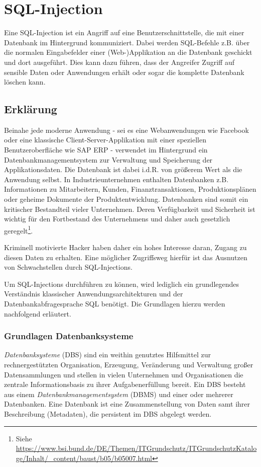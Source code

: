 \chapter{SQL-Injection}
Eine SQL-Injection ist ein Angriff auf eine Benutzerschnittstelle, die mit einer Datenbank im Hintergrund kommuniziert. Dabei werden SQL-Befehle z.B. über die normalen Eingabefelder einer (Web-)Applikation an die Datenbank geschickt und dort ausgeführt. Dies kann dazu führen, dass der Angreifer Zugriff auf sensible Daten oder Anwendungen erhält oder sogar die komplette Datenbank löschen kann. 

\section{Erklärung}
Beinahe jede moderne Anwendung - sei es eine Webanwendungen wie Facebook oder eine klassische Client-Server-Applikation mit einer speziellen Benutzeroberfläche wie SAP ERP - verwendet im Hintergrund ein Datenbankmanagementsystem zur Verwaltung und Speicherung der Applikationsdaten. Die Datenbank ist dabei i.d.R. von größerem Wert als die Anwendung selbst. In Industrieunternehmen enthalten Datenbanken z.B. Informationen zu Mitarbeitern, Kunden, Finanztransaktionen, Produktionsplänen oder geheime Dokumente der Produktentwicklung. Datenbanken sind somit ein kritischer Bestandteil vieler Unternehmen. Deren Verfügbarkeit und Sicherheit ist wichtig für den Fortbestand des Unternehmens und daher auch gesetzlich geregelt\footnote{Siehe \url{https://www.bsi.bund.de/DE/Themen/ITGrundschutz/ITGrundschutzKataloge/Inhalt/_content/baust/b05/b05007.html} }.

Kriminell motivierte Hacker haben daher ein hohes Interesse daran, Zugang zu diesen Daten zu erhalten. Eine möglicher Zugriffsweg hierfür ist das Ausnutzen von Schwachstellen durch SQL-Injections.

Um SQL-Injections durchführen zu können, wird lediglich ein grundlegendes Verständnis klassischer Anwendungsarchitekturen und der Datenbankabfragesprache SQL benötigt. Die Grundlagen hierzu werden nachfolgend erläutert.

\subsection{Grundlagen Datenbanksysteme}
\emph{Datenbanksysteme} (DBS) sind ein weithin genutztes Hilfsmittel zur rechnergestützten Organisation, Erzeugung, Veränderung und Verwaltung großer Datensammlungen und stellen in vielen Unternehmen und Organisationen die zentrale Informationsbasis zu ihrer Aufgabenerfüllung bereit. Ein DBS besteht aus einem \emph{Datenbankmanagementsystem} (DBMS) und einer oder mehrerer Datenbanken. Eine Datenbank ist eine Zusammenstellung von Daten samt ihrer Beschreibung (Metadaten), die persistent im DBS abgelegt werden.

